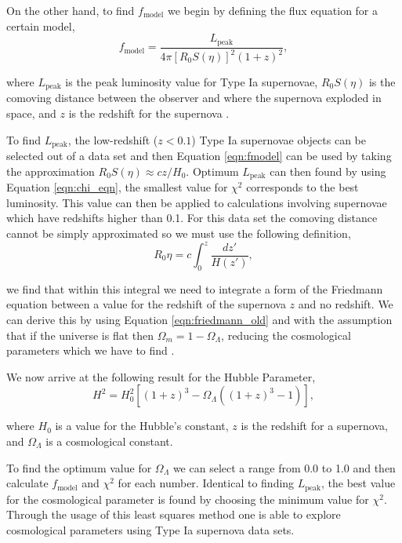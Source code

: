 \documentclass[twocolumn]{revtex4}
\begin{document}
On the other hand, to find $f_\text{model}$ we begin by defining the flux equation for a certain model,
\begin{equation}
f_\text{model}=\frac{L_\text{peak}}{4\pi [R_0 S(\eta)]^2 (1+z)^2},
\label{eqn:fmodel}
\end{equation}

where $L_\text{peak}$ is the peak luminosity value for Type Ia supernovae, $R_0 S(\eta)$ is the comoving distance between the observer and where the supernova exploded in space, and $z$ is the redshift for the supernova \cite{script}.

To find $L_\text{peak}$, the low-redshift ($z<0.1$) Type Ia supernovae objects can be selected out of a data set and then Equation \ref{eqn:fmodel} can be used by taking the approximation $R_0 S(\eta) \approx cz/H_0$. Optimum $L_\text{peak}$ can then found by using Equation \ref{eqn:chi_eqn}, the smallest value for $\chi^2$ corresponds to the best luminosity. This value can then be applied to calculations involving supernovae which have redshifts higher than 0.1. For this data set the comoving distance cannot be simply approximated so we must use the following definition,
\begin{equation}
R_0 \eta = c \int_0^z \frac{dz'}{H(z')},
\label{eqn:comoving_integral}
\end{equation}

we find that within this integral we need to integrate a form of the Friedmann equation between a value for the redshift of the supernova $z$ and no redshift. We can derive this by using Equation \ref{eqn:friedmann_old} and with the assumption that if the universe is flat then $\Omega_m = 1 - \Omega_{\Lambda}$, reducing the cosmological parameters which we have to find \cite{script}. 

We now arrive at the following result for the Hubble Parameter,
\begin{equation}
H^2 = H_0^2 [(1+z)^3 - \Omega_{\Lambda} ((1+z)^3-1)],
\label{eqn:hubble_parameter}
\end{equation}

where $H_0$ is a value for the Hubble's constant, $z$ is the redshift for a supernova, and $\Omega_\Lambda$ is a cosmological constant.

To find the optimum value for $\Omega_\Lambda$ we can select a range from 0.0 to 1.0 and then calculate $f_\text{model}$ and $\chi^2$ for each number. Identical to finding $L_\text{peak}$, the best value for the cosmological parameter is found by choosing the minimum value for $\chi^2$. Through the usage of this least squares method one is able to explore cosmological parameters using Type Ia supernova data sets.
\end{document}
